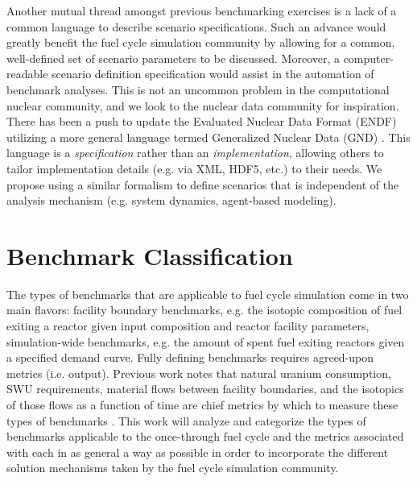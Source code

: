 \documentclass{anstrans}
\begin{document}
Another mutual thread amongst previous benchmarking exercises is a 
lack of a common language to describe scenario specifications. Such 
an advance would greatly benefit the fuel cycle simulation community 
by allowing for a common, well-defined set of scenario parameters to 
be discussed. Moreover, a computer-readable scenario definition 
specification would assist in the automation of benchmark
analyses. This is not an uncommon problem in the computational 
nuclear community, and we look to the nuclear data community for 
inspiration. There has been a push to update the Evaluated Nuclear
Data Format (ENDF) utilizing a more general language termed 
Generalized Nuclear Data (GND) \cite{mattoon_generalized_2012}. This
language is a \emph{specification} rather than an 
\emph{implementation}, allowing others to tailor implementation 
details (e.g. via XML, HDF5, etc.) to their needs. We propose using a 
similar formalism to define scenarios that is independent of the 
analysis mechanism (e.g. system dynamics, agent-based modeling).

\section{Benchmark Classification}
The types of benchmarks that are applicable to fuel cycle simulation
come in two main flavors: facility boundary benchmarks, e.g. the
isotopic composition of fuel exiting a reactor given input composition
and reactor facility parameters, simulation-wide benchmarks, e.g. the
amount of spent fuel exiting reactors given a specified demand curve.
Fully defining benchmarks requires agreed-upon metrics (i.e. output).
Previous work notes that natural uranium consumption, SWU 
requirements, material flows between facility boundaries, and the 
isotopics of those flows as a function of time are chief metrics by
which to measure these types of benchmarks 
\cite{boucher_specification_2008}. This work will analyze and 
categorize the types of benchmarks applicable to the once-through 
fuel cycle and the metrics associated with each in as general a way
as possible in order to incorporate the different solution mechanisms
taken by the fuel cycle simulation community.

\end{document}
